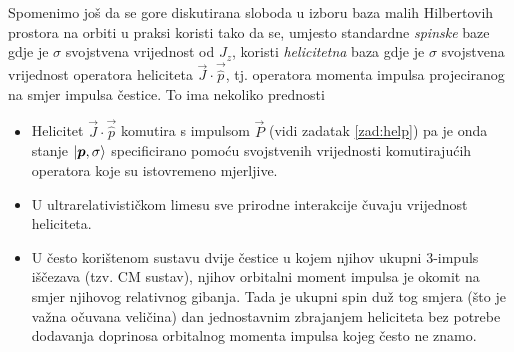 Spomenimo još da se gore diskutirana sloboda u izboru baza malih Hilbertovih
prostora na orbiti u praksi koristi tako da se, umjesto standardne \emph{spinske}
baze gdje je $\sigma$ svojstvena vrijednost od $J_z$,
koristi \emph{helicitetna} baza gdje je $\sigma$ svojstvena vrijednost operatora
heliciteta $\vec{J}\cdot\vec{\hat{p}}$, tj. operatora momenta impulsa projeciranog na smjer
impulsa čestice. To ima nekoliko prednosti   
\begin{itemize}
    \item Helicitet $\vec{J}\cdot\vec{\hat{p}}$ komutira s impulsom $\vec{P}$ 
        (vidi zadatak \ref{zad:help}) pa je onda stanje $\ket{\vec{p}, \sigma}$
        specificirano pomoću svojstvenih vrijednosti komutirajućih operatora koje
        su istovremeno mjerljive.

   \item U ultrarelativističkom limesu sve prirodne interakcije
       čuvaju vrijednost heliciteta.

   \item U često korištenom sustavu dvije čestice u kojem njihov ukupni 3-impuls
       iščezava (tzv. CM sustav), njihov orbitalni moment impulsa je okomit na smjer njihovog
       relativnog gibanja. Tada je ukupni spin duž tog smjera (što je važna očuvana veličina)
       dan jednostavnim zbrajanjem heliciteta bez potrebe dodavanja doprinosa
       orbitalnog momenta impulsa kojeg često ne znamo.
\end{itemize}

